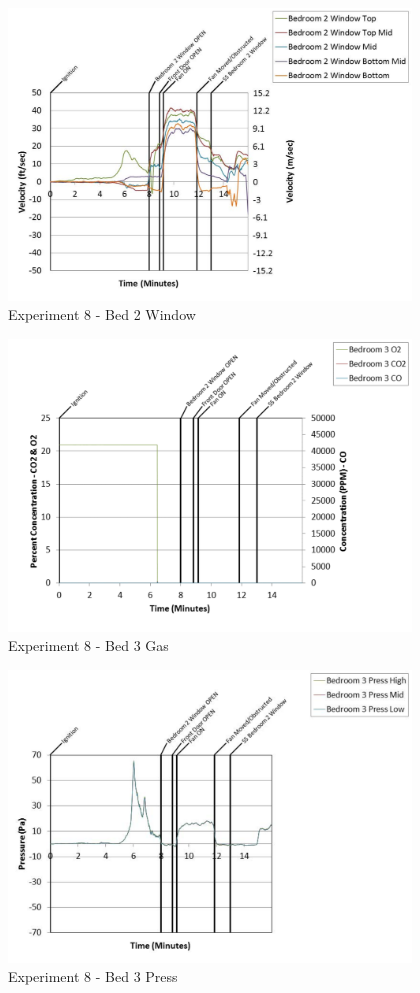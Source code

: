 \documentclass{article}
\begin{document}
\begin{appendices}
	\begin{figure}[h!]
		\centering
		\includegraphics[height=3.05in]{0_Images/Results_Charts/Exp_8_Charts/Bed2Window.pdf}
		\caption{Experiment 8 - Bed 2 Window}
	\end{figure}
 
	\clearpage

	\begin{figure}[h!]
		\centering
		\includegraphics[height=3.05in]{0_Images/Results_Charts/Exp_8_Charts/Bed3Gas.pdf}
		\caption{Experiment 8 - Bed 3 Gas}
	\end{figure}
 

	\begin{figure}[h!]
		\centering
		\includegraphics[height=3.05in]{0_Images/Results_Charts/Exp_8_Charts/Bed3Press.pdf}
		\caption{Experiment 8 - Bed 3 Press}
	\end{figure}
 

\end{appendices}
\end{document}
